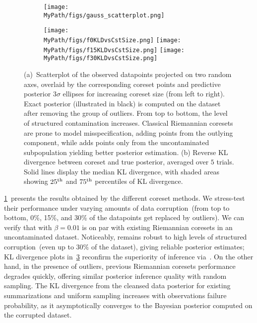 \begin{figure}[t!]
	\centering 
	\begin{subfigure}[b]{0.9\textwidth} 
		\texttt{[image: \\MyPath/figs/gauss\_scatterplot.png]}
		\caption{\label{fig:beta_gaussian_coreset_points}}
	\end{subfigure}
	\hfill\qquad
	\begin{subfigure}[b]{0.9\textwidth} 
		\centering
		\texttt{[image: \\MyPath/figs/f0KLDvsCstSize.png]}
		\centering
		\hfill
		\texttt{[image: \\MyPath/figs/f15KLDvsCstSize.png]}
		\centering
		\hfill
		\texttt{[image: \\MyPath/figs/f30KLDvsCstSize.png]}
		\caption{\label{fig:gauss_kld}}
	\end{subfigure}	
	\centering
	\caption{(a)~Scatterplot of the observed datapoints projected on two random axes, overlaid by the corresponding coreset points and predictive posterior $3\sigma$ ellipses for increasing coreset size (from left to right). Exact posterior (illustrated in black) is computed on the dataset after removing the group of outliers. From top to bottom, the level of structured contamination increases. Classical Riemannian coresets are prone to model misspecification, adding points from the outlying component, while \bcores{} adds points only from the uncontaminated subpopulation yielding better posterior estimation. (b) Reverse KL divergence between coreset and true posterior, averaged over $5$ trials. Solid lines display the median KL divergence, with shaded areas showing $25\textsuperscript{th}$ and $75\textsuperscript{th}$ percentiles of KL divergence.}
\end{figure}


\cref{fig:beta_gaussian_coreset_points}~presents the results obtained by the different coreset methods. We stress-test their performance under varying amounts of data corruption~(from top to bottom, 0\%, 15\%, and 30\% of the datapoints get replaced by outliers). We can verify that \bcores{} with $\beta=0.01$ is on par with existing Riemannian coresets in an uncontaminated dataset. Noticeably, \bcores{} remains robust to high levels of structured corruption~(even up to $30\%$ of the dataset), giving reliable posterior estimates; KL divergence plots in~\cref{fig:gauss_kld} reconfirm the superiority of inference via~\bcores{}. On the other hand, in the presence of outliers, previous Riemannian coresets performance degrades quickly, offering similar posterior inference quality with random sampling. The KL divergence from the cleansed data posterior for existing summarizations and uniform sampling increases with observations failure probability, as it asymptotically converges to the Bayesian posterior computed on the corrupted dataset. 

